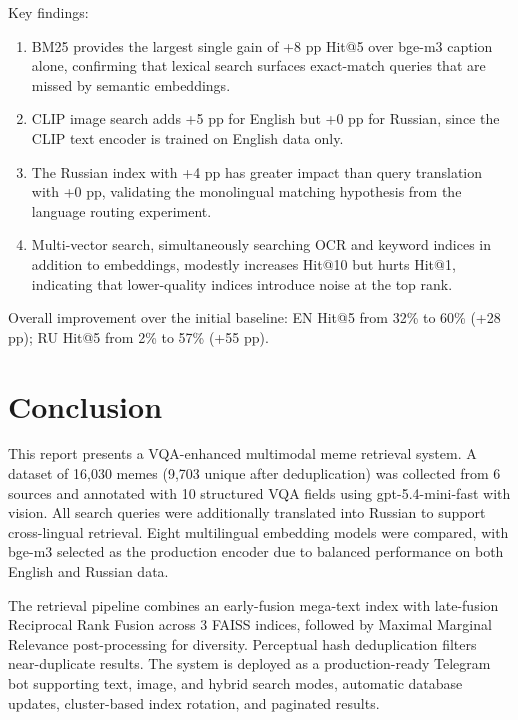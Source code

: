 \documentclass[a4paper,12pt]{article}
\begin{document}
Key findings:
\begin{enumerate}
    \item BM25 provides the largest single gain of +8 pp Hit@5 over bge-m3 caption alone, confirming that lexical search surfaces exact-match queries that are missed by semantic embeddings.
    \item CLIP image search adds +5 pp for English but +0 pp for Russian, since the CLIP text encoder is trained on English data only.
    \item The Russian index with +4 pp has greater impact than query translation with +0 pp, validating the monolingual matching hypothesis from the language routing experiment.
    \item Multi-vector search, simultaneously searching OCR and keyword indices in addition to embeddings, modestly increases Hit@10 but hurts Hit@1, indicating that lower-quality indices introduce noise at the top rank.
\end{enumerate}

Overall improvement over the initial baseline: EN Hit@5 from 32\% to 60\% (+28 pp); RU Hit@5 from 2\% to 57\% (+55 pp).

\pagebreak

\section*{Conclusion}

This report presents a VQA-enhanced multimodal meme retrieval system. A dataset of 16,030 memes (9,703 unique after deduplication) was collected from 6 sources and annotated with 10 structured VQA fields using gpt-5.4-mini-fast with vision. All search queries were additionally translated into Russian to support cross-lingual retrieval. Eight multilingual embedding models were compared, with bge-m3 selected as the production encoder due to balanced performance on both English and Russian data.

The retrieval pipeline combines an early-fusion mega-text index with late-fusion Reciprocal Rank Fusion across 3 FAISS indices, followed by Maximal Marginal Relevance post-processing for diversity. Perceptual hash deduplication filters near-duplicate results. The system is deployed as a production-ready Telegram bot supporting text, image, and hybrid search modes, automatic database updates, cluster-based index rotation, and paginated results.
\end{document}
